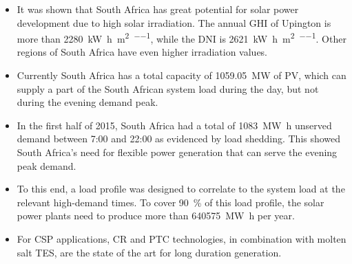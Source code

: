 \begin{itemize}
\item It was shown that South Africa has great potential for solar power development due to high solar irradiation. The annual \ac{GHI} of Upington is more than \SI{2280}{\kilo\watt\hour\per\square\metre\per\year}, while the \ac{DNI} is \SI{2621}{\kilo\watt\hour\per\square\metre\per\year}. Other regions of South Africa have even higher irradiation values.
\item Currently South Africa has a total capacity of \SI{1059.05}{\mega\watt} of \ac{PV}, which can supply a part of the South African system load during the day, but not during the evening demand peak.

\item In the first half of 2015, South Africa had a total of \SI{1083}{\mega\watt\hour} unserved demand between 7:00 and 22:00 as evidenced by load shedding. This showed South Africa's need for flexible power generation that can serve the evening peak demand. 


\item To this end, a load profile was designed to correlate to the system load at the relevant high-demand times. To cover \SI{90}{\percent} of this load profile, the solar power plants need to produce more than \SI{640575}{\mega\watt\hour} per year.


\item For \ac{CSP} applications, \ac{CR} and \ac{PTC} technologies, in combination with molten salt \ac{TES}, are the state of the art for long duration generation.



\end{itemize}
